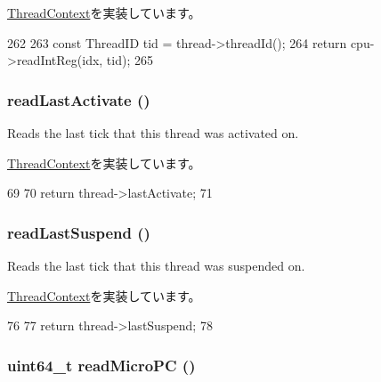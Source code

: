 \hyperlink{classThreadContext_aebc14d23082a9095e0f641a6c5c8b083}{ThreadContext}を実装しています。


\begin{DoxyCode}
262 {
263     const ThreadID tid = thread->threadId();
264     return cpu->readIntReg(idx, tid);
265 }
\end{DoxyCode}
\hypertarget{classInOrderThreadContext_afaa8f9eb8d809cccd31829ba793a433a}{
\subsubsection[{readLastActivate}]{ readLastActivate ()}}
\label{classInOrderThreadContext_afaa8f9eb8d809cccd31829ba793a433a}
Reads the last tick that this thread was activated on. 

\hyperlink{classThreadContext_a99574c7f076a26875232079962cbe522}{ThreadContext}を実装しています。


\begin{DoxyCode}
69 {
70     return thread->lastActivate;
71 }
\end{DoxyCode}
\hypertarget{classInOrderThreadContext_a7d0b0631c7087d361f6ae11379c06b15}{
\subsubsection[{readLastSuspend}]{ readLastSuspend ()}}
\label{classInOrderThreadContext_a7d0b0631c7087d361f6ae11379c06b15}
Reads the last tick that this thread was suspended on. 

\hyperlink{classThreadContext_affe95ad96bb334a8132f9c69291f39a4}{ThreadContext}を実装しています。


\begin{DoxyCode}
76 {
77     return thread->lastSuspend;
78 }
\end{DoxyCode}
\hypertarget{classInOrderThreadContext_ae2413b39c462b20a91b585723e44e7f1}{
\subsubsection[{readMicroPC}]{\setlength{\rightskip}{0pt plus 5cm}uint64\_\-t readMicroPC ()}}
\label{classInOrderThreadContext_ae2413b39c462b20a91b585723e44e7f1}



